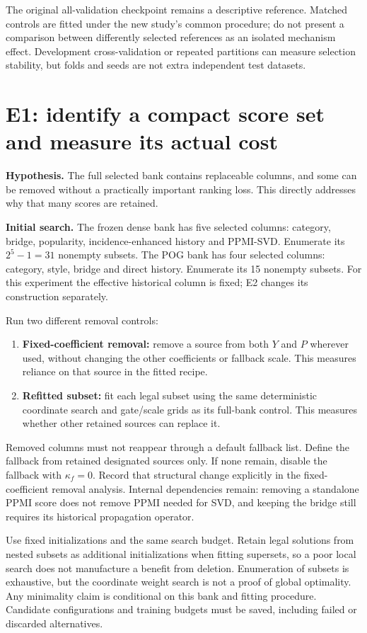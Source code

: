 \documentclass[11pt,a4paper]{article}
\begin{document}
The original all-validation checkpoint remains a descriptive reference.
Matched controls are fitted under the new study's common procedure; do not
present a comparison between differently selected references as an isolated
mechanism effect. Development cross-validation or repeated partitions can
measure selection stability, but folds and seeds are not extra independent
test datasets.

\section{E1: identify a compact score set and measure its actual cost}
\label{sec:e1}

\textbf{Hypothesis.} The full selected bank contains replaceable columns,
and some can be removed without a practically important ranking loss.
This directly addresses why that many scores are retained.

\textbf{Initial search.} The frozen dense bank has five selected columns:
category, bridge, popularity, incidence-enhanced history and PPMI-SVD.
Enumerate its $2^5-1=31$ nonempty subsets. The POG bank has four selected
columns: category, style, bridge and direct history. Enumerate its 15
nonempty subsets. For this experiment the effective historical column is
fixed; E2 changes its construction separately.

Run two different removal controls:
\begin{enumerate}
\item \textbf{Fixed-coefficient removal:} remove a source from both $Y$
and $P$ wherever used, without changing the other coefficients or fallback
scale. This measures reliance on that source in the fitted recipe.
\item \textbf{Refitted subset:} fit each legal subset using the same
deterministic coordinate search and gate/scale grids as its full-bank control.
This measures whether other retained sources can replace it.
\end{enumerate}

Removed columns must not reappear through a default fallback list. Define
the fallback from retained designated sources only. If none remain, disable
the fallback with $\kappa_f=0$. Record that structural change explicitly
in the fixed-coefficient removal analysis. Internal dependencies remain:
removing a standalone PPMI score does not remove PPMI needed for SVD, and
keeping the bridge still requires its historical propagation operator.

Use fixed initializations and the same search budget. Retain legal solutions
from nested subsets as additional initializations when fitting supersets,
so a poor local search does not manufacture a benefit from deletion.
Enumeration of subsets is exhaustive, but the coordinate weight search is
not a proof of global optimality. Any minimality claim is conditional on
this bank and fitting procedure. Candidate configurations and training
budgets must be saved, including failed or discarded alternatives.
\end{document}
